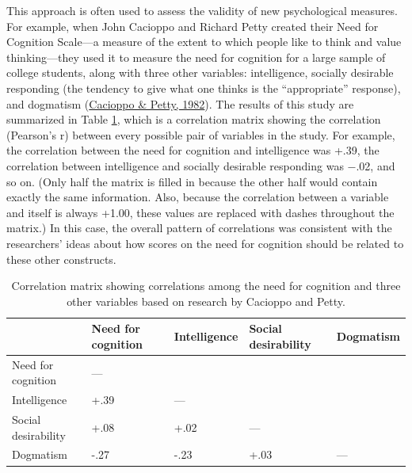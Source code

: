 \documentclass[
]{krantz}
\begin{document}
This approach is often used to assess the validity of new psychological measures. For example, when John Cacioppo and Richard Petty created their Need for Cognition Scale---a measure of the extent to which people like to think and value thinking---they used it to measure the need for cognition for a large sample of college students, along with three other variables: intelligence, socially desirable responding (the tendency to give what one thinks is the ``appropriate'' response), and dogmatism (\protect\hyperlink{ref-cacioppo1982need}{Cacioppo \& Petty, 1982}). The results of this study are summarized in Table \ref{tab:nfc}, which is a correlation matrix showing the correlation (Pearson's r) between every possible pair of variables in the study. For example, the correlation between the need for cognition and intelligence was +.39, the correlation between intelligence and socially desirable responding was −.02, and so on. (Only half the matrix is filled in because the other half would contain exactly the same information. Also, because the correlation between a variable and itself is always +1.00, these values are replaced with dashes throughout the matrix.) In this case, the overall pattern of correlations was consistent with the researchers' ideas about how scores on the need for cognition should be related to these other constructs.

\begin{table}

\caption{\label{tab:nfc}Correlation matrix showing correlations among the need for cognition and three other variables based on research by Cacioppo and Petty.}
\centering
\begin{tabular}[t]{l|l|l|l|l}
\hline
 & Need for cognition & Intelligence & Social desirability & Dogmatism\\
\hline
Need for cognition & — &  &  & \\
\hline
Intelligence & +.39 & — &  & \\
\hline
Social desirability & +.08 & +.02 & — & \\
\hline
Dogmatism & -.27 & -.23 & +.03 & —\\
\hline
\end{tabular}
\end{table}
\end{document}
